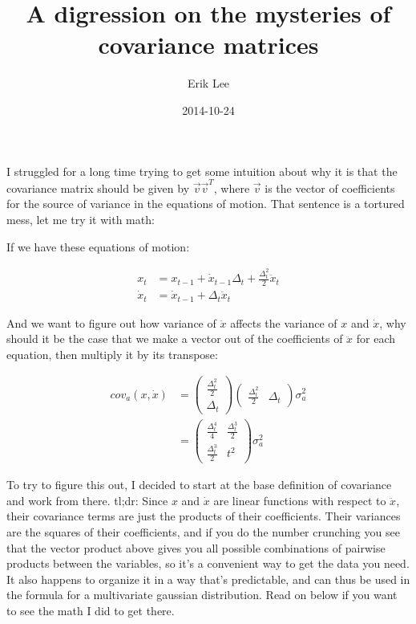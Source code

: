 \documentclass[12pt]{article}
\author{Erik Lee}
\date{2014-10-24}
\title{A digression on the mysteries of covariance matrices}
\begin{document}
\maketitle

I struggled for a long time trying to get some intuition about why it is that
the covariance matrix should be given by $\vec{v} \vec{v}^T$, where $\vec{v}$ is
the vector of coefficients for the source of variance in the equations of
motion. That sentence is a tortured mess, let me try it with math:

If we have these equations of motion:

\begin{align}
  x_t &= x_{t-1} + \dot{x}_{t-1} \Delta_t + \frac{\Delta_t^2}{2} \ddot{x}_t \\
  \dot{x}_t &= \dot{x}_{t-1} + \Delta_t \ddot{x}_t
\end{align}

And we want to figure out how variance of $\ddot{x}$ affects the variance of $x$
and $\dot{x}$, why should it be the case that we make a vector out of the
coefficients of $\ddot{x}$ for each equation, then multiply it by its transpose:

\begin{align}
cov_a(x,\dot{x}) &= \begin{pmatrix}\frac{\Delta_t^2}{2} \\ \Delta_t\end{pmatrix}
\begin{pmatrix}\frac{\Delta_t^2}{2} & \Delta_t\end{pmatrix}\sigma_a^2\\
 &= \begin{pmatrix}\frac{\Delta_t^4}{4} & \frac{\Delta_t^3}{2} \\
\frac{\Delta_t^3}{2} & t^2 \end{pmatrix}\sigma_a^2
\end{align}

To try to figure this out, I decided to start at the base definition of
covariance and work from there. tl;dr: Since $x$ and $\dot{x}$ are linear
functions with respect to $\ddot{x}$, their covariance terms are just the
products of their coefficients. Their variances are the squares of their
coefficients, and if you do the number crunching you see that the vector product
above gives you all possible combinations of pairwise products between the
variables, so it's a convenient way to get the data you need. It also happens to
organize it in a way that's predictable, and can thus be used in the formula for
a multivariate gaussian distribution. Read on below if you want to see the math
I did to get there. 
\end{document}
